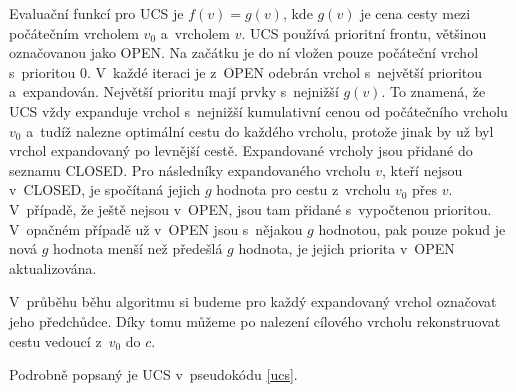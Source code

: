 \documentclass[12pt]{report}			%
\begin{document}
			Evaluační funkcí pro UCS je $f(v) = g(v)$, kde $g(v)$ je cena cesty mezi počátečním vrcholem $v_0$ a~vrcholem $v$. 
			UCS používá prioritní frontu, většinou označovanou jako OPEN. Na začátku je do ní vložen pouze počáteční vrchol s~prioritou 0. V~každé iteraci je z~OPEN odebrán vrchol s~největší prioritou a~expandován. Největší prioritu mají prvky s~nejnižší $g(v)$. To znamená, že UCS vždy expanduje vrchol s~nejnižší kumulativní cenou od počátečního vrcholu $v_0$ a~tudíž nalezne optimální cestu do každého vrcholu, protože jinak by už byl vrchol expandovaný po levnější cestě. Expandované vrcholy jsou přidané do seznamu CLOSED. Pro následníky expandovaného vrcholu $v$, kteří nejsou v~CLOSED, je spočítaná jejich $g$ hodnota pro cestu z~vrcholu $v_0$ přes $v$. V~případě, že ještě nejsou v~OPEN, jsou tam přidané s~vypočtenou prioritou. V~opačném případě už v~OPEN jsou s~nějakou $g$ hodnotou, pak pouze pokud je nová $g$ hodnota menší než předešlá $g$ hodnota, je jejich priorita v~OPEN aktualizována.
			
			 V~průběhu běhu algoritmu si budeme pro každý expandovaný vrchol označovat jeho předchůdce. Díky tomu můžeme po nalezení cílového vrcholu rekonstruovat cestu vedoucí z~$v_0$ do $c$.
			
			
			
			Podrobně popsaný je UCS v~pseudokódu \ref{ucs}.
			
\end{document}
